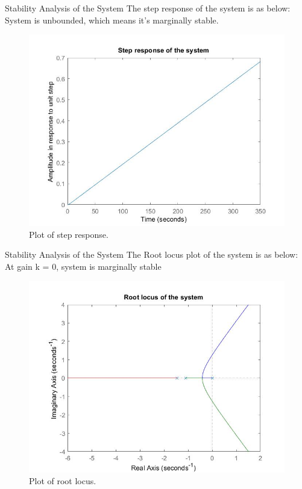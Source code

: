 \documentclass[10pt,compress,mathserif]{beamer}
\begin{document}
\begin{frame}{Stability Analysis of the System}
The step response of the system is as below: System is unbounded, which means it's marginally stable. 
\vskip10pt
\begin{figure}[h!]
\centering
\includegraphics[scale=0.25]{Step_response.jpg}
\caption{Plot of step response.}
\end{figure}


\end{frame}


\begin{frame}{Stability Analysis of the System}
The Root locus plot of the system is as below: At gain k = 0, system is marginally stable
\begin{figure}[h!]
\centering
\includegraphics[scale=0.3]{root_locus.jpg}
\caption{Plot of root locus.}
\end{figure}
\end{frame}
\end{document}
